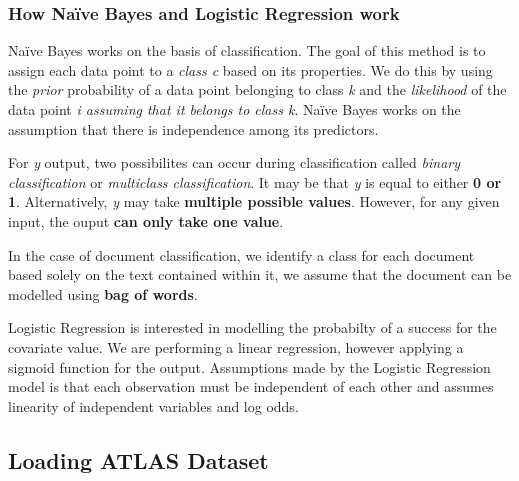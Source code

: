 \documentclass[11pt]{article}
\begin{document}
    \subsubsection{How Naïve Bayes and Logistic Regression
work}\label{how-nauxefve-bayes-and-logistic-regression-work}

Naïve Bayes works on the basis of classification. The goal of this
method is to assign each data point to a \emph{class c} based on its
properties. We do this by using the \emph{prior} probability of a data
point belonging to class \emph{k} and the \emph{likelihood} of the data
point \emph{i assuming that it belongs to class k}. Naïve Bayes works on
the assumption that there is independence among its predictors.

For \emph{y} output, two possibilites can occur during classification
called \emph{binary classification} or \emph{multiclass classification}.
It may be that \emph{y} is equal to either \textbf{0 or 1}.
Alternatively, \emph{y} may take \textbf{multiple possible values}.
However, for any given input, the ouput \textbf{can only take one
value}.

In the case of document classification, we identify a class for each
document based solely on the text contained within it, we assume that
the document can be modelled using \textbf{bag of words}.

Logistic Regression is interested in modelling the probabilty of a
success for the covariate value. We are performing a linear regression,
however applying a sigmoid function for the output. Assumptions made by
the Logistic Regression model is that each observation must be
independent of each other and assumes linearity of independent variables
and log odds.

    \subsection{Loading ATLAS Dataset}\label{loading-atlas-dataset}
\end{document}
